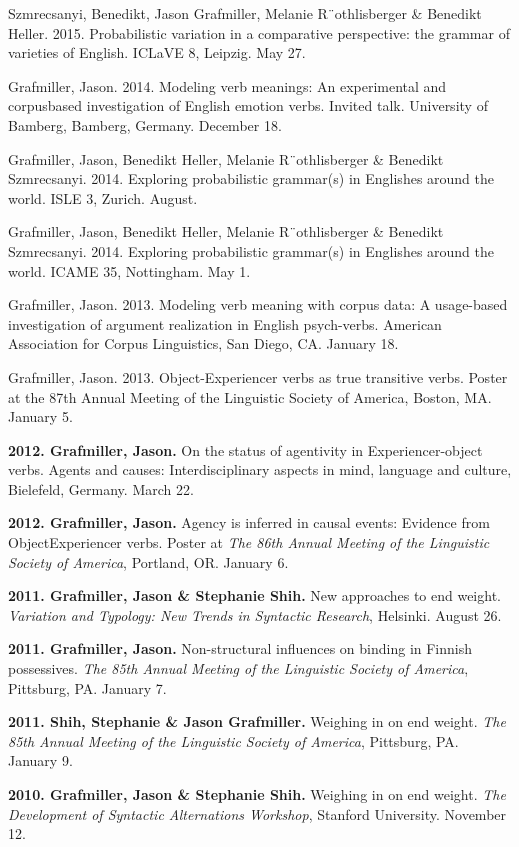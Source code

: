 \documentclass[11pt,]{article}
\begin{document}
Szmrecsanyi, Benedikt, Jason Grafmiller, Melanie R¨othlisberger \&
Benedikt Heller. 2015. Probabilistic variation in a comparative
perspective: the grammar of varieties of English. ICLaVE 8, Leipzig. May
27.

Grafmiller, Jason. 2014. Modeling verb meanings: An experimental and
corpusbased investigation of English emotion verbs. Invited talk.
University of Bamberg, Bamberg, Germany. December 18.

Grafmiller, Jason, Benedikt Heller, Melanie R¨othlisberger \& Benedikt
Szmrecsanyi. 2014. Exploring probabilistic grammar(s) in Englishes
around the world. ISLE 3, Zurich. August.

Grafmiller, Jason, Benedikt Heller, Melanie R¨othlisberger \& Benedikt
Szmrecsanyi. 2014. Exploring probabilistic grammar(s) in Englishes
around the world. ICAME 35, Nottingham. May 1.

Grafmiller, Jason. 2013. Modeling verb meaning with corpus data: A
usage-based investigation of argument realization in English
psych-verbs. American Association for Corpus Linguistics, San Diego, CA.
January 18.

Grafmiller, Jason. 2013. Object-Experiencer verbs as true transitive
verbs. Poster at the 87th Annual Meeting of the Linguistic Society of
America, Boston, MA. January 5.

\textbf{2012. Grafmiller, Jason.} On the status of agentivity in
Experiencer-object verbs. Agents and causes: Interdisciplinary aspects
in mind, language and culture, Bielefeld, Germany. March 22.

\textbf{2012. Grafmiller, Jason.} Agency is inferred in causal events:
Evidence from ObjectExperiencer verbs. Poster at \emph{The 86th Annual
Meeting of the Linguistic Society of America}, Portland, OR. January 6.

\textbf{2011. Grafmiller, Jason \& Stephanie Shih.} New approaches to
end weight. \emph{Variation and Typology: New Trends in Syntactic
Research}, Helsinki. August 26.

\textbf{2011. Grafmiller, Jason.} Non-structural influences on binding
in Finnish possessives. \emph{The 85th Annual Meeting of the Linguistic
Society of America}, Pittsburg, PA. January 7.

\textbf{2011. Shih, Stephanie \& Jason Grafmiller.} Weighing in on end
weight. \emph{The 85th Annual Meeting of the Linguistic Society of
America}, Pittsburg, PA. January 9.

\textbf{2010. Grafmiller, Jason \& Stephanie Shih.} Weighing in on end
weight. \emph{The Development of Syntactic Alternations Workshop},
Stanford University. November 12.
\end{document}

